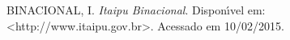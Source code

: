 {BINACIONAL, I. \emph{Itaipu Binacional}.
Dispon{\'\i}vel em: <http://www.itaipu.gov.br>.
Acessado em 10/02/2015. }